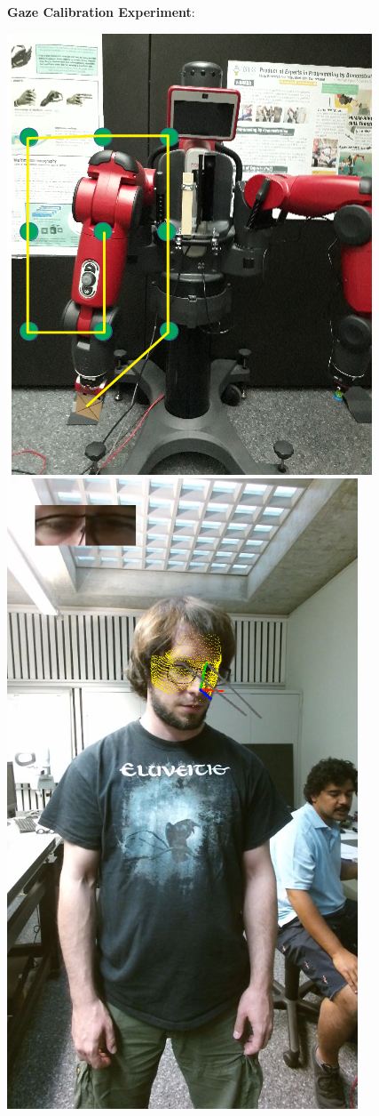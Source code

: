 \documentclass{beamer}
\begin{document}
\begin{frame}
\textbf{Gaze Calibration Experiment}:
\begin{center}
\includegraphics[scale=0.4]{Pictures/Baxter_Setup_Dynamic.png} \hspace{0.5cm}
\includegraphics[scale=0.3]{Pictures/Baxter_View.png}
\end{center}
\end{frame}
\end{document}
